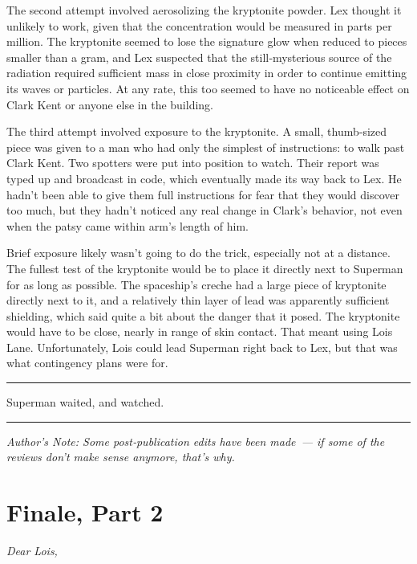 \documentclass[ebook,12pt]{memoir}
\begin{document}
The second attempt involved aerosolizing the kryptonite powder. Lex
thought it unlikely to work, given that the concentration would be
measured in parts per million. The kryptonite seemed to lose the
signature glow when reduced to pieces smaller than a gram, and Lex
suspected that the still‐mysterious source of the radiation required
sufficient mass in close proximity in order to continue emitting its
waves or particles. At any rate, this too seemed to have no noticeable
effect on Clark Kent or anyone else in the building.

The third attempt involved exposure to the kryptonite. A small,
thumb‐sized piece was given to a man who had only the simplest of
instructions: to walk past Clark Kent. Two spotters were put into
position to watch. Their report was typed up and broadcast in code,
which eventually made its way back to Lex. He hadn't been able to give
them full instructions for fear that they would discover too much, but
they hadn't noticed any real change in Clark's behavior, not even when
the patsy came within arm's length of him.

Brief exposure likely wasn't going to do the trick, especially not at a
distance. The fullest test of the kryptonite would be to place it
directly next to Superman for as long as possible. The spaceship's
creche had a large piece of kryptonite directly next to it, and a
relatively thin layer of lead was apparently sufficient shielding, which
said quite a bit about the danger that it posed. The kryptonite would
have to be close, nearly in range of skin contact. That meant using Lois
Lane. Unfortunately, Lois could lead Superman right back to Lex, but
that was what contingency plans were for.

\begin{center}\rule{0.5\linewidth}{\linethickness}\end{center}

Superman waited, and watched.

\begin{center}\rule{0.5\linewidth}{\linethickness}\end{center}

\emph{Author's Note: Some post‐publication edits have been made~--- if
some of the reviews don't make sense anymore, that's why.}
\chapter{Finale, Part 2}\label{finale-part-2}

\emph{Dear Lois,}
\end{document}
